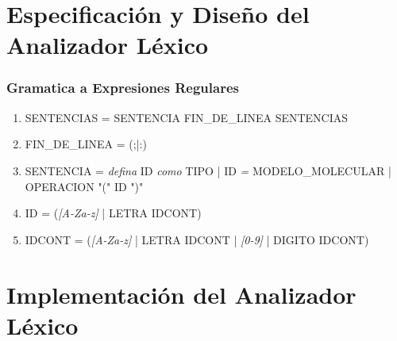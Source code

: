 \section{Especificación y Diseño del Analizador Léxico}

\subsubsection{Gramatica a Expresiones Regulares}

\begin{enumerate}
    \item SENTENCIAS = SENTENCIA FIN\_DE\_LINEA SENTENCIAS
    \item FIN\_DE\_LINEA = (;|:)
    \item SENTENCIA = \textit{defina} ID \textit{como} TIPO | ID \textit{=} MODELO\_MOLECULAR | OPERACION "(" ID ")"
    \item ID = (\textit{[A-Za-z]} | LETRA IDCONT)
    \item IDCONT = (\textit{[A-Za-z]} | LETRA IDCONT | \textit{[0-9]} | DIGITO IDCONT)
\end{enumerate}

\section{Implementación del Analizador Léxico}